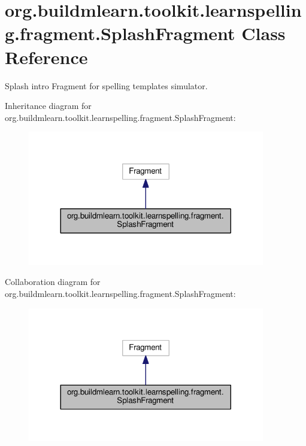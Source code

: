 \hypertarget{classorg_1_1buildmlearn_1_1toolkit_1_1learnspelling_1_1fragment_1_1SplashFragment}{}\section{org.\+buildmlearn.\+toolkit.\+learnspelling.\+fragment.\+Splash\+Fragment Class Reference}
\label{classorg_1_1buildmlearn_1_1toolkit_1_1learnspelling_1_1fragment_1_1SplashFragment}


Splash intro Fragment for spelling template\textquotesingle{}s simulator.  




Inheritance diagram for org.\+buildmlearn.\+toolkit.\+learnspelling.\+fragment.\+Splash\+Fragment\+:
\nopagebreak
\begin{figure}[H]
\begin{center}
\leavevmode
\includegraphics[width=293pt]{classorg_1_1buildmlearn_1_1toolkit_1_1learnspelling_1_1fragment_1_1SplashFragment__inherit__graph}
\end{center}
\end{figure}


Collaboration diagram for org.\+buildmlearn.\+toolkit.\+learnspelling.\+fragment.\+Splash\+Fragment\+:
\nopagebreak
\begin{figure}[H]
\begin{center}
\leavevmode
\includegraphics[width=293pt]{classorg_1_1buildmlearn_1_1toolkit_1_1learnspelling_1_1fragment_1_1SplashFragment__coll__graph}
\end{center}
\end{figure}
